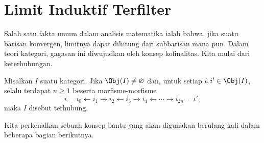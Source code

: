 
\section{Limit Induktif Terfilter}\label{sec:filtered-indlim}
\hypertarget{o014.aljabr2.chapter1.filtered-inductive-limits}{ }
\enlargethispage{2\baselineskip}

Salah satu fakta umum dalam analisis matematika ialah bahwa, jika suatu
barisan konvergen, limitnya dapat dihitung dari subbarisan mana pun. Dalam
teori kategori, gagasan ini diwujudkan oleh konsep kofinalitas. Kita mulai
dari keterhubungan.

\begin{definisi}
	Misalkan $I$ suatu kategori. Jika $\Obj(I) \neq \emptyset$ dan, untuk setiap
	$i, i' \in \Obj(I)$, selalu terdapat $n \geq 1$ beserta morfisme-morfisme
	\[ i = i_0 \leftarrow i_1 \to i_2 \leftarrow i_3 \to i_4 \leftarrow \cdots \to i_{2n} = i' , \]
	maka $I$ disebut terhubung.
\end{definisi}

Kita perkenalkan sebuah konsep bantu yang akan digunakan berulang kali dalam
beberapa bagian berikutnya.

